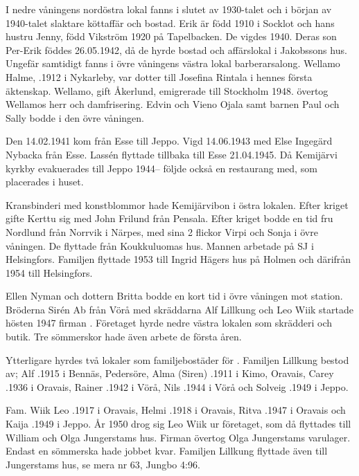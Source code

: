 
I nedre våningens nordöstra lokal fanns i slutet av 1930-talet och i början av 1940-talet slaktare  köttaffär och bostad. Erik är född 1910 i Socklot och hans hustru Jenny, född Vikström 1920 på Tapelbacken. De vigdes 1940. Deras son Per-Erik föddes 26.05.1942, då de hyrde bostad och affärslokal i Jakobssons hus. Ungefär samtidigt fanns i övre våningens västra lokal  barberarsalong. Wellamo Halme, .1912 i Nykarleby, var dotter till Josefina Rintala i hennes första äktenskap. Wellamo, gift Åkerlund, emigrerade till Stockholm 1948.  övertog Wellamos herr och damfrisering. Edvin och Vieno Ojala samt barnen Paul och Sally bodde i den övre våningen.

Den 14.02.1941 kom  från Esse till Jeppo. Vigd 14.06.1943 med Else Ingegärd Nybacka från Esse. Lassén flyttade tillbaka till Esse 21.04.1945. Då Kemijärvi kyrkby evakuerades till Jeppo 1944-- följde också en restaurang  med, som placerades i huset.

Kransbinderi med konstblommor hade Kemijärvibon  i östra lokalen. Efter kriget gifte Kerttu sig med John Frilund från Pensala. Efter kriget bodde en tid fru Nordlund från Norrvik i Närpes, med sina 2 flickor Virpi och Sonja i övre våningen. De flyttade från Koukkuluomas hus. Mannen arbetade på SJ i Helsingfors. Familjen flyttade 1953 till Ingrid Hägers hus på Holmen och därifrån 1954 till Helsingfors.

Ellen Nyman och dottern Britta bodde en kort tid i övre våningen mot station. Bröderna Sirén Ab från Vörå med skräddarna Alf Lillkung och Leo Wiik startade hösten 1947 firman . Företaget hyrde nedre västra lokalen som skrädderi och butik. Tre sömmerskor hade även arbete de första åren.

Ytterligare hyrdes två lokaler som familjebostäder för . Familjen Lillkung bestod av; Alf 	 .1915 i Bennäs, Pedersöre,	Alma (Siren) .1911 i Kimo, Oravais,	Carey .1936 i Oravais, Rainer	.1942 i Vörå, Nils	.1944 i Vörå	och	Solveig	.1949 i Jeppo.

Fam. Wiik	Leo	.1917 i Oravais,	Helmi	.1918 i Oravais,	Ritva	.1947 i Oravais och Kaija .1949 i Jeppo. År 1950 drog sig Leo Wiik ur företaget, som då flyttades till William och Olga Jungerstams hus. Firman övertog Olga Jungerstams varulager. Endast en sömmerska hade jobbet kvar. Familjen Lillkung flyttade även till Jungerstams hus, se mera nr 63, Jungbo 4:96.

